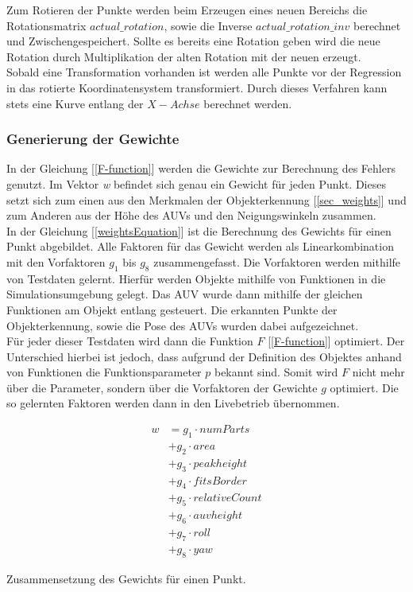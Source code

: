 Zum Rotieren der Punkte werden beim Erzeugen eines neuen Bereichs die Rotationsmatrix $actual\_rotation$, sowie die Inverse $actual\_rotation\_inv$ berechnet und Zwischengespeichert. Sollte es bereits eine Rotation geben wird die neue Rotation durch Multiplikation der alten Rotation mit der neuen erzeugt.\\
Sobald eine Transformation vorhanden ist werden alle Punkte vor der Regression in das rotierte Koordinatensystem transformiert. Durch dieses Verfahren kann stets eine Kurve entlang der $X-Achse$ berechnet werden.

\subsubsection*{Generierung der Gewichte}
\label{sec_calcWeights}
In der Gleichung [\ref{F-function}] werden die Gewichte zur Berechnung des Fehlers genutzt. Im Vektor \textit{w} befindet sich genau ein Gewicht für jeden Punkt. Dieses setzt sich zum einen aus den Merkmalen der Objekterkennung [\ref{sec_weights}] und zum Anderen aus der Höhe des AUVs und den Neigungswinkeln zusammen.\\
In der Gleichung [\ref{weightsEquation}] ist die Berechnung des Gewichts für einen Punkt abgebildet. Alle Faktoren für das Gewicht werden als Linearkombination mit den Vorfaktoren $g_1$ bis $g_8$ zusammengefasst. Die Vorfaktoren werden mithilfe von Testdaten gelernt. Hierfür werden Objekte mithilfe von Funktionen in die Simulationsumgebung gelegt. Das AUV wurde dann mithilfe der gleichen Funktionen am Objekt entlang gesteuert. Die erkannten Punkte der Objekterkennung, sowie die Pose des AUVs wurden dabei aufgezeichnet.\\
Für jeder dieser Testdaten wird dann die Funktion $F$ [\ref{F-function}] optimiert. Der Unterschied hierbei ist jedoch, dass aufgrund der Definition des Objektes anhand von Funktionen die Funktionsparameter $p$ bekannt sind. Somit wird $F$ nicht mehr über die Parameter, sondern über die Vorfaktoren der Gewichte $g$ optimiert. Die so gelernten Faktoren werden dann in den Livebetrieb übernommen.
\begin{ownequation}[H]
\begin{equation}
\begin{split}
w &= g_1 \cdot numParts \\
&+ g_2 \cdot area \\
&+ g_3 \cdot peakheight \\
&+ g_4 \cdot fitsBorder \\
&+ g_5 \cdot relativeCount \\
&+ g_6 \cdot auvheight \\
&+ g_7 \cdot roll \\
&+ g_8 \cdot yaw
\end{split}
\end{equation}
\caption{Zusammensetzung des Gewichts für einen Punkt.}
\label{weightsEquation}
\end{ownequation}